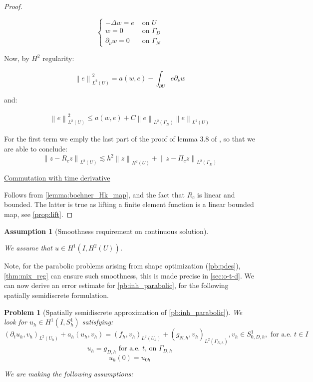 \documentclass[english,a4paper,10pt,oneside]{scrbook}	%
\theoremstyle{break}
\newtheorem{ass}[equation]{Assumption}
\newtheorem{pb}[equation]{Problem}
\newenvironment{mproof}[1][\proofname]{%
  \begin{proof}[#1]$ $\par\nobreak\ignorespaces
}{%
  \end{proof}
}
\renewcommand*{\proofname}{Proof}
\theoremstyle{remark}
\newcommand{\norm}[1]{\left\lVert#1\right\rVert}
\begin{document}
\begin{appendices}
\begin{mproof}
$$
\left\{\begin{matrix}
-\Delta w = e & \text{ on } U \\ 
w = 0 & \text{ on } \Gamma_D \\ 
\partial_\nu w = 0 & \text{ on } \Gamma_N 
\end{matrix}\right.
$$

Now, by $H^2$ regularity:

$$\norm{e}^2_{L^2(U)} = a(w,e) - \int_{\partial U} e \partial_\nu w  $$

and:

\begin{align*}
\norm{e}^2_{L^2(U)} \leq a(w,e) + C \norm{e}_{L^2(\Gamma_D)}\norm{e}_{L^2( U)} 
\end{align*}

For the first term we emply the last part of the proof of lemma 3.8 of \cite{ranner}, so that we are able to conclude:
$$\norm{z-R_c z}_{L^2(U)}\lesssim h^2\norm{z}_{H^2(U)} + \norm{z-\Pi_c z}_{L^2(\Gamma_D)} $$

\underline{Commutation with time derivative}

Follows from \cref{lemma:bochner_Hk_map}, and the fact that $R_c$ is linear and bounded. The latter is true as lifting a finite element function is a linear bounded map, see \cref{prop:lift}.
\end{mproof}

\begin{ass}[Smoothness requirement on continuous solution]
\label{ass:smoothness_par_discr}

We assume that $u \in H^1(I, H^2(U))$.
\end{ass}

Note, for the parabolic problems arising from shape optimization (\cref{pb:pdes}), \cref{thm:mix_reg} can ensure such smoothness, this is made precise in \cref{sec:o-t-d}.
We can now derive an error estimate for \cref{pb:inh_parabolic}, for the following spatially semidiscrete formulation.

\begin{pb}[Spatially semidiscrete approximation of \cref{pb:inh_parabolic}]
\label{pb:inh_parabolic_discr}
We look for $u_h \in H^1(I, S^1_h)$ satisfying: 
$$(\partial_t u_h, v_h)_{L^2(U_h)} + a_h(u_h, v_h) = (f_h, v_h)_{L^2(U_h)} + (g_{N,h}, v_h)_{L^2(\Gamma_{N,h})}, v_h \in S^1_{0,D,h}, \text{ for a.e. }t\in I$$
$$u_h=g_{D,h}\text{ for a.e. }t \text{,  on } \Gamma_{D,h}$$
$$u_h(0)=u_{0h}$$

We are making the following assumptions:


\end{pb}
\end{appendices}
\end{document}
